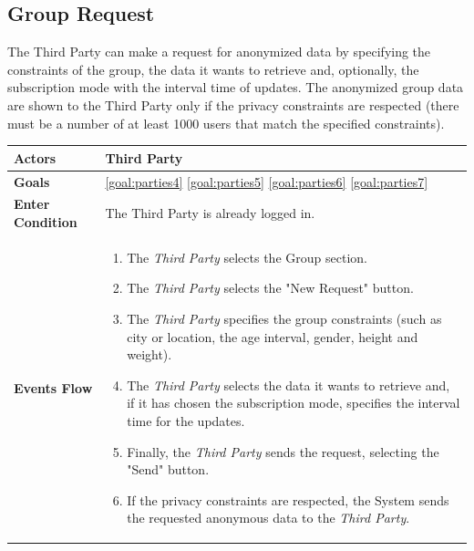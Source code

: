 \newpage
\subsection{Group Request}
The Third Party can make a request for anonymized data by specifying the constraints of the group, the data it wants to retrieve and, optionally, the subscription mode with the interval time of updates. The anonymized group data are shown to the Third Party only if the privacy constraints are respected (there must be a number of at least 1000 users that match the specified constraints).

\begin{table}[H]
	\centering
    
    \begin{tabular}{|p{3.5cm}|p{10.3cm}|}
    
    \hline
    \textbf{\large{Actors}} & Third Party \\ 			
    \hline
    \textbf{\large{Goals}} 				& \ref{goal:parties4}                                                         \ref{goal:parties5}                                    \ref{goal:parties6} \ref{goal:parties7}\\
    
    \hline
    
    \textbf{\large{Enter Condition}}	& The Third Party is already logged in. \\
    
    \hline
    
    \textbf{\large{Events Flow}}		& \begin{enumerate}[leftmargin=0.5cm]
                                \item The \emph{Third Party} selects the Group section.
                                \item The \emph{Third Party} selects the "New Request" button.
                                \item The \emph{Third Party} specifies the group constraints (such as city or location, the age interval, gender, height and weight).
                                 \item The \emph{Third Party} selects the data it wants to retrieve and, if it has chosen the subscription mode, specifies the interval time for the updates.
                                 \item Finally, the \emph{Third Party} sends the request, selecting the "Send" button.
                                 \item If the privacy constraints are respected, the System sends the requested anonymous data to the \emph{Third Party}.
                                           

\end{enumerate}
\end{tabular}
\end{table}
